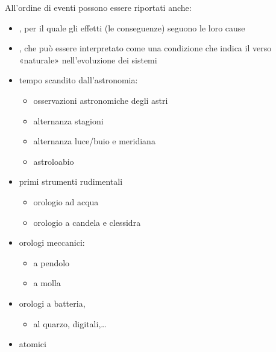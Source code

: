\documentclass[letterpaper,10pt,italian]{jupyterBook}
\begin{document}
\sphinxAtStartPar
{} 

\sphinxAtStartPar
All’ordine di eventi possono essere riportati anche:
\begin{itemize}
\item {} 
\sphinxAtStartPar
{}, per il quale gli effetti (le conseguenze) seguono le loro cause

\item {} 
\sphinxAtStartPar
{}, che può essere interpretato come una condizione che indica il verso «naturale» nell’evoluzione dei sistemi

\end{itemize}

\sphinxAtStartPar
{}
\begin{itemize}
\item {} 
\sphinxAtStartPar
tempo scandito dall’astronomia:
\begin{itemize}
\item {} 
\sphinxAtStartPar
osservazioni astronomiche degli astri

\item {} 
\sphinxAtStartPar
alternanza stagioni

\item {} 
\sphinxAtStartPar
alternanza luce/buio e meridiana

\item {} 
\sphinxAtStartPar
astroloabio

\end{itemize}

\item {} 
\sphinxAtStartPar
primi strumenti rudimentali
\begin{itemize}
\item {} 
\sphinxAtStartPar
orologio ad acqua

\item {} 
\sphinxAtStartPar
orologio a candela e clessidra

\end{itemize}

\item {} 
\sphinxAtStartPar
orologi meccanici:
\begin{itemize}
\item {} 
\sphinxAtStartPar
a pendolo

\item {} 
\sphinxAtStartPar
a molla

\end{itemize}

\item {} 
\sphinxAtStartPar
orologi a batteria,
\begin{itemize}
\item {} 
\sphinxAtStartPar
al quarzo, digitali,…

\end{itemize}

\item {} 
\sphinxAtStartPar
atomici

\end{itemize}
\end{document}
